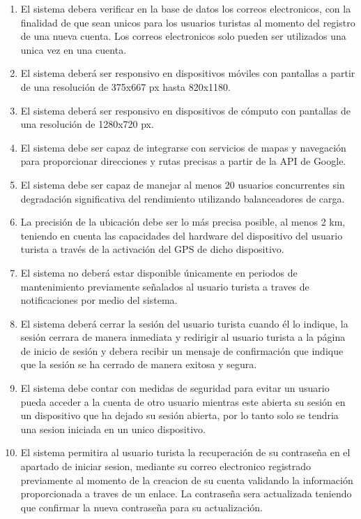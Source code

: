 \documentclass{article}
\begin{document}
\begin{enumerate}
    \item El sistema debera verificar en la base de datos los correos electronicos, con la finalidad de que sean unicos para los usuarios turistas al momento del registro de una nueva cuenta. Los correos electronicos solo pueden ser utilizados una unica vez en una cuenta.

    \item El sistema deberá ser responsivo en dispositivos móviles con pantallas a partir de una resolución de 375x667 px hasta 820x1180.
    
    \item El sistema deberá ser responsivo en dispositivos de cómputo con pantallas de una resolución de 1280x720 px.
    
    \item El sistema debe ser capaz de integrarse con servicios de mapas y navegación para proporcionar direcciones y rutas precisas a partir de la API de Google.
    
    \item El sistema debe ser capaz de manejar al menos 20 usuarios concurrentes sin degradación significativa del rendimiento utilizando balanceadores de carga.
    
    \item La precisión de la ubicación debe ser lo más precisa posible, al menos 2 km, teniendo en cuenta las capacidades del hardware del dispositivo del usuario turista a través de la activación del GPS de dicho dispositivo.
    
    \item El sistema no deberá estar disponible únicamente en periodos de mantenimiento previamente señalados al usuario turista a traves de notificaciones por medio del sistema.
    
    \item El sistema deberá cerrar la sesión del usuario turista cuando él lo indique, la sesión cerrara de manera inmediata y redirigir al usuario turista a la página de inicio de sesión y debera recibir un mensaje de confirmación que indique que la sesión se ha cerrado de manera exitosa y segura. 
    
    \item El sistema debe contar con medidas de seguridad para evitar un usuario pueda acceder a la cuenta de otro usuario mientras este abierta su sesión en un dispositivo que ha dejado su sesión abierta, por lo tanto solo se tendria una sesion iniciada en un unico dispositivo.

    \item  El sistema permitira al usuario turista la recuperación de su contraseña en el apartado de iniciar sesion, mediante su correo electronico registrado previamente al momento de la creacion de su cuenta validando la información proporcionada a traves de un enlace. La contraseña sera actualizada teniendo que confirmar la nueva contraseña para su actualización.
\end{enumerate}
\end{document}
